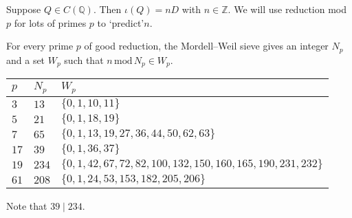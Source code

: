 \documentclass{beamer}
\newcommand{\Q}{{\mathbb Q}}
\newcommand{\Z}{{\mathbb Z}}
\theoremstyle{definition}
\theoremstyle{remark}
\begin{document}
\begin{frame}
Suppose $Q \in C(\Q)$. Then $\iota(Q)=nD$ with $n \in \Z$.
We will use reduction mod $p$ for lots of primes $p$
to \lq predict\rq $n$.

For every prime $p$ of good reduction, the Mordell--Weil sieve
gives an integer $N_p$ and a set $W_p$ such
that $n \, \mathrm{mod} \, N_p \in W_p$.

\bigskip

\begin{tabular}{|l|l|l|}
\hline
$p$ & $N_p$ & $W_p$\\
\hline
$3$ & $13$ & $\{ 0, 1, 10, 11 \}$ \\
$5$ & $21$ & $\{ 0, 1, 18, 19 \} $ \\
$7$ & $ 65$ & $\{  0, 1, 13, 19, 27, 36, 44, 50, 62, 63 \}$\\
$17$ & $ 39$ & $\{  0, 1, 36, 37 \}$\\ 
$19$ & $234$ & $\{0, 1, 42, 67, 72, 82, 100, 132, 150, 160, 165, 190, 231, 232\}$\\ 
$61$ & $208$ & $\{  0, 1, 24, 53, 153, 182, 205, 206\}$\\ 
\hline
\end{tabular}

\bigskip

Note that $39 \mid 234$.

\end{frame}
\end{document}
